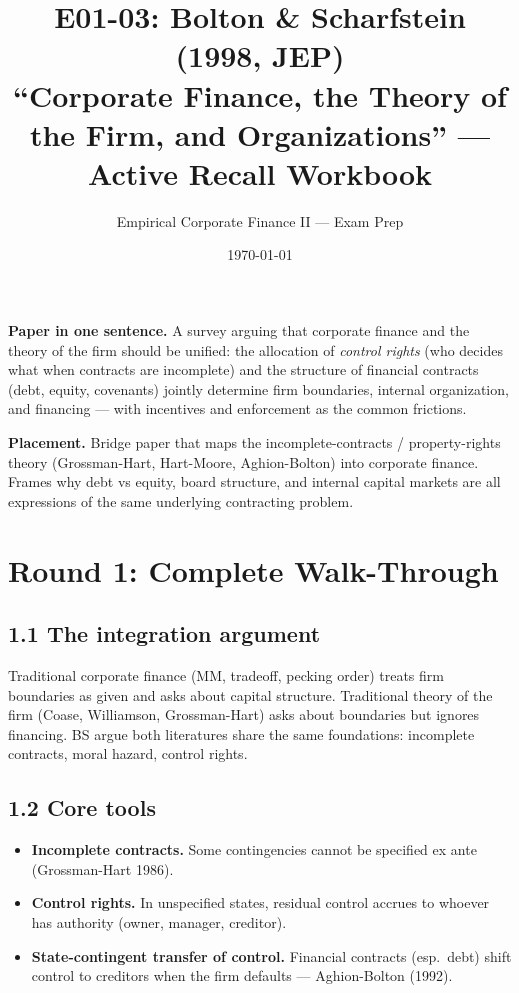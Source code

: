 \documentclass[11pt]{article}
\title{E01-03: Bolton \& Scharfstein (1998, JEP) \\
\large ``Corporate Finance, the Theory of the Firm, and Organizations'' --- Active Recall Workbook}
\author{Empirical Corporate Finance II --- Exam Prep}
\date{\today}
\begin{document}
\maketitle

\begin{keybox}
\textbf{Paper in one sentence.} A survey arguing that corporate finance and the theory of the firm should be unified: the allocation of \emph{control rights} (who decides what when contracts are incomplete) and the structure of financial contracts (debt, equity, covenants) jointly determine firm boundaries, internal organization, and financing --- with incentives and enforcement as the common frictions.

\textbf{Placement.} Bridge paper that maps the incomplete-contracts / property-rights theory (Grossman-Hart, Hart-Moore, Aghion-Bolton) into corporate finance. Frames why debt vs equity, board structure, and internal capital markets are all expressions of the same underlying contracting problem.
\end{keybox}

\section*{Round 1: Complete Walk-Through}

\subsection*{1.1 The integration argument}
Traditional corporate finance (MM, tradeoff, pecking order) treats firm boundaries as given and asks about capital structure. Traditional theory of the firm (Coase, Williamson, Grossman-Hart) asks about boundaries but ignores financing. BS argue both literatures share the same foundations: incomplete contracts, moral hazard, control rights.

\subsection*{1.2 Core tools}
\begin{itemize}
\item \textbf{Incomplete contracts.} Some contingencies cannot be specified ex ante (Grossman-Hart 1986).
\item \textbf{Control rights.} In unspecified states, residual control accrues to whoever has authority (owner, manager, creditor).
\item \textbf{State-contingent transfer of control.} Financial contracts (esp.\ debt) shift control to creditors when the firm defaults --- Aghion-Bolton (1992).
\end{itemize}
\end{document}
